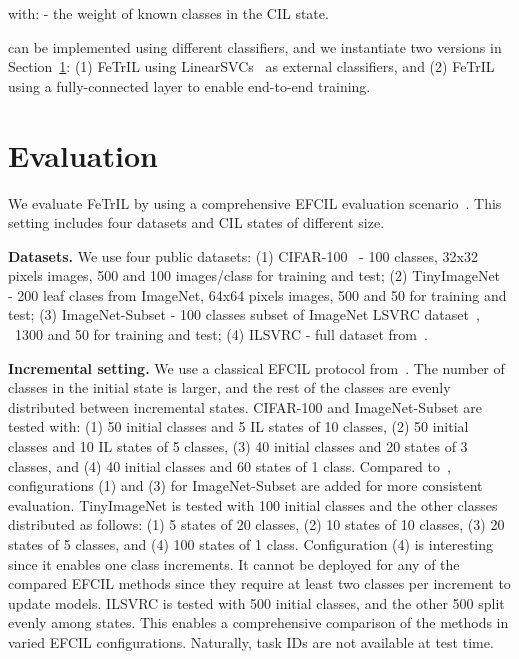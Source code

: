 \documentclass[10pt,twocolumn,letterpaper]{article}
\makeatletter
\newcommand{\ourmodel}{FeTrIL\@\xspace}
\newcommand{\ourmodelFc}{FeTrIL\@\xspace}
\makeatother
\begin{document}
with:  - the weight of known classes in the  CIL state. 

 can be implemented using different classifiers, and we instantiate two versions in Section~\ref{sec:evaluation}: 
(1) \ourmodel using LinearSVCs~\cite{fabian2012_scikitlearn} as external classifiers, 
and 
(2) \ourmodelFc using a fully-connected layer to enable end-to-end training. 

\section{Evaluation}
\label{sec:evaluation}
We evaluate \ourmodel by using a comprehensive EFCIL evaluation scenario~\cite{zhu2021class,zhu2021pass,zhu2022self}. 
This setting includes four datasets and CIL states of different size.

\textbf{Datasets.} We use four public datasets:
(1) CIFAR-100~\cite{krizhevsky2009_cifar100} - 100 classes, 32x32 pixels images, 500 and 100 images/class for training and test;
(2) TinyImageNet~\cite{le2015tiny} - 200 leaf clases from ImageNet, 64x64 pixels images, 500 and 50 for training and test;
(3) ImageNet-Subset - 100 classes subset of ImageNet LSVRC dataset~\cite{olga2015_ilsvrc}, ~1300 and 50 for training and test;
(4) ILSVRC - full dataset from~\cite{olga2015_ilsvrc}.

\textbf{Incremental setting.} We use a classical EFCIL protocol from~\cite{zhu2021class,zhu2021pass,zhu2022self}. 
The number of classes in the initial state is larger, and the rest of the classes are evenly distributed between incremental states. 
CIFAR-100 and ImageNet-Subset are tested with: (1) 50 initial classes and 5 IL states of 10 classes, (2) 50 initial classes and 10 IL states of 5 classes, (3) 40 initial classes and 20 states of 3 classes, and (4) 40 initial classes and 60 states of 1 class. 
Compared to~\cite{zhu2021class,zhu2021pass,zhu2022self}, configurations (1) and (3) for ImageNet-Subset are added for more consistent evaluation.
TinyImageNet is tested with 100 initial classes and the other classes distributed as follows: (1) 5 states of 20 classes, (2) 10 states of 10 classes, (3) 20 states of 5 classes, and (4) 100 states of 1 class.
Configuration (4) is interesting since it enables one class increments.
It cannot be deployed for any of the compared EFCIL methods since they require at least two classes per increment to update models. 
ILSVRC is tested with 500 initial classes, and the other 500 split evenly among  states.
This enables a comprehensive comparison of the methods in varied EFCIL configurations.
Naturally, task IDs are not available at test time. 
\end{document}
